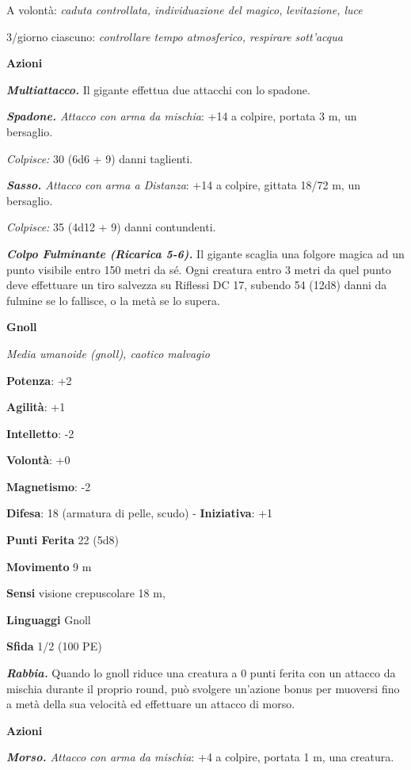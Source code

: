 \begin{multicols}{2}
A volontà: \emph{caduta controllata, individuazione del magico,}
\emph{levitazione, luce}

3/giorno ciascuno: \emph{controllare tempo atmosferico, respirare}
\emph{sott'acqua}

\smallskip\textbf{Azioni}

\emph{\textbf{Multiattacco.}} Il gigante effettua due attacchi con lo
spadone.

\emph{\textbf{Spadone.} Attacco con arma da mischia}: +14 a colpire,
portata 3 m, un bersaglio.

\emph{Colpisce:} 30 (6d6 + 9) danni taglienti.

\emph{\textbf{Sasso.} Attacco con arma a Distanza}: +14 a colpire,
gittata 18/72 m, un bersaglio.

\emph{Colpisce:} 35 (4d12 + 9) danni contundenti.

\emph{\textbf{Colpo Fulminante (Ricarica 5-6).}} Il gigante scaglia una
folgore magica ad un punto visibile entro 150 metri da sé. Ogni creatura
entro 3 metri da quel punto deve effettuare un tiro salvezza su Riflessi DC 17, subendo 54 (12d8) danni da fulmine se lo fallisce, o la
metà se lo supera.



\textbf{Gnoll}

\emph{Media umanoide (gnoll), caotico malvagio}

\textbf{Potenza}: +2

\textbf{Agilità}: +1

\textbf{Intelletto}: -2

\textbf{Volontà}: +0

\textbf{Magnetismo}: -2

\textbf{Difesa}: 18 (armatura di pelle, scudo) - \textbf{Iniziativa}: +1

\textbf{Punti Ferita} 22 (5d8)

\textbf{Movimento} 9 m

\textbf{Sensi} visione crepuscolare 18 m, 

\textbf{Linguaggi} Gnoll

\textbf{Sfida} 1/2 (100 PE)\smallskip

\emph{\textbf{Rabbia.}} Quando lo gnoll riduce una creatura a 0 punti
ferita con un attacco da mischia durante il proprio round, può svolgere
un'azione bonus per muoversi fino a metà della sua velocità ed
effettuare un attacco di morso.

\smallskip\textbf{Azioni}

\emph{\textbf{Morso.} Attacco con arma da mischia}: +4 a colpire,
portata 1 m, una creatura.


\end{multicols}
